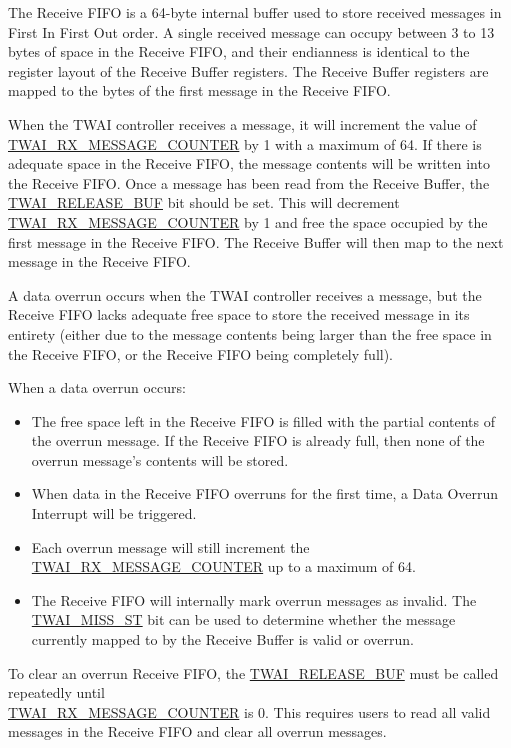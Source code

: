 \documentclass[main\_\_EN.tex]{subfiles}
\begin{document}
The Receive FIFO is a 64-byte internal buffer used to store received messages in First In First Out order. A single received message can occupy between 3 to 13 bytes of space in the Receive FIFO, and their endianness is identical to the register layout of the Receive Buffer registers. The Receive Buffer registers are mapped to the bytes of the first message in the Receive FIFO.

When the TWAI controller receives a message, it will increment the value of \hyperref[fielddesc:TWAIRXMESSAGECOUNTER]{TWAI\_RX\_MESSAGE\_COUNTER} by 1 with a maximum of 64. If there is adequate space in the Receive FIFO, the message contents will be written into the Receive FIFO. Once a message has been read from the Receive Buffer, the \hyperref[fielddesc:TWAIRELEASEBUF]{TWAI\_RELEASE\_BUF} bit should be set. This will decrement \hyperref[fielddesc:TWAIRXMESSAGECOUNTER]{TWAI\_RX\_MESSAGE\_COUNTER} by 1 and free the space occupied by the first message in the Receive FIFO. The Receive Buffer will then map to the next message in the Receive FIFO.

A data overrun occurs when the TWAI controller receives a message, but the Receive FIFO lacks adequate free space to store the received message in its entirety (either due to the message contents being larger than the free space in the Receive FIFO, or the Receive FIFO being completely full).

When a data overrun occurs:
\begin{itemize}
    \item The free space left in the Receive FIFO is filled with the partial contents of the overrun message. If the Receive FIFO is already full, then none of the overrun message's contents will be stored.
    \item When data in the Receive FIFO overruns for the first time, a Data Overrun Interrupt will be triggered.
    \item Each overrun message will still increment the  \hyperref[fielddesc:TWAIRXMESSAGECOUNTER]{TWAI\_RX\_MESSAGE\_COUNTER} up to a maximum of 64.
    \item The Receive FIFO will internally mark overrun messages as invalid. The \hyperref[fielddesc:TWAIMISSST]{TWAI\_MISS\_ST} bit can be used to determine whether the message currently mapped to by the Receive Buffer is valid or overrun.
\end{itemize}

To clear an overrun Receive FIFO, the \hyperref[fielddesc:TWAIRELEASEBUF]{TWAI\_RELEASE\_BUF} must be called repeatedly until \\\hyperref[fielddesc:TWAIRXMESSAGECOUNTER]{TWAI\_RX\_MESSAGE\_COUNTER} is 0. This requires users to read all valid messages in the Receive FIFO and clear all overrun messages.
\end{document}
